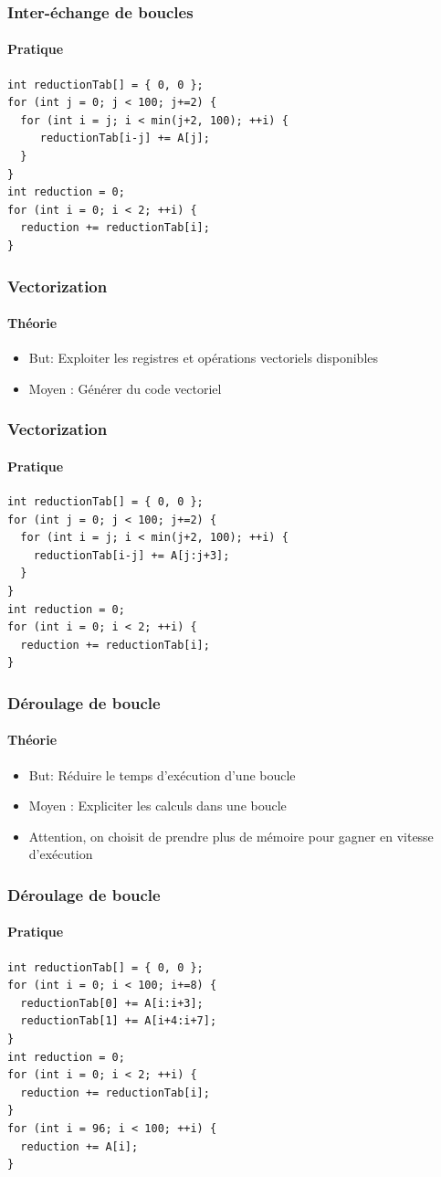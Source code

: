 \documentclass{beamer}
\begin{document}
\begin{frame}[fragile]
\frametitle{Inter-échange de boucles}
\framesubtitle{Pratique}
\begin{lstlisting}
int reductionTab[] = { 0, 0 };
for (int j = 0; j < 100; j+=2) {
  for (int i = j; i < min(j+2, 100); ++i) {
     reductionTab[i-j] += A[j];
  }
}
int reduction = 0;
for (int i = 0; i < 2; ++i) {
  reduction += reductionTab[i];
}
\end{lstlisting}
\end{frame}

\begin{frame}
\frametitle{Vectorization}
\framesubtitle{Théorie}
\begin{itemize}
\item But: Exploiter les registres et opérations vectoriels disponibles
\item Moyen : Générer du code vectoriel
\end{itemize}
\end{frame}

\begin{frame}[fragile]
\frametitle{Vectorization}
\framesubtitle{Pratique}
\begin{lstlisting}
int reductionTab[] = { 0, 0 };
for (int j = 0; j < 100; j+=2) {
  for (int i = j; i < min(j+2, 100); ++i) {
    reductionTab[i-j] += A[j:j+3];
  }
}
int reduction = 0;
for (int i = 0; i < 2; ++i) {
  reduction += reductionTab[i];
}
\end{lstlisting}
\end{frame}

\begin{frame}
\frametitle{Déroulage de boucle}
\framesubtitle{Théorie}
\begin{itemize}
\item But: Réduire le temps d'exécution d'une boucle
\item Moyen : Expliciter les calculs dans une boucle
\item Attention, on choisit de prendre plus de mémoire pour gagner en vitesse d'exécution
\end{itemize}
\end{frame}

\begin{frame}[fragile]
\frametitle{Déroulage de boucle}
\framesubtitle{Pratique}
\begin{lstlisting}
int reductionTab[] = { 0, 0 };
for (int i = 0; i < 100; i+=8) {
  reductionTab[0] += A[i:i+3]; 
  reductionTab[1] += A[i+4:i+7];
}
int reduction = 0;
for (int i = 0; i < 2; ++i) {
  reduction += reductionTab[i];
}
for (int i = 96; i < 100; ++i) {
  reduction += A[i];
}
\end{lstlisting}
\end{frame}
\end{document}
